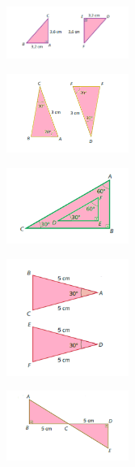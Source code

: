 {{{\begin{escolha}
\item
\begin{figure}[H]
\centering\includegraphics[width=4cm]{./imgSAEB_8_MAT/media/image19.png}
\end{figure}  
\item
\begin{figure}[H]
\centering\includegraphics[width=4cm]{./imgSAEB_8_MAT/media/image20.png}
\end{figure}  
\item
\begin{figure}[H]
\centering\includegraphics[width=4cm]{./imgSAEB_8_MAT/media/image21.png}
\end{figure}  
\item
\begin{figure}[H]
\centering\includegraphics[width=4cm]{./imgSAEB_8_MAT/media/image22.png}
\end{figure}  
\item
\begin{figure}[H]
\centering\includegraphics[width=4cm]{./imgSAEB_8_MAT/media/image23.png}
\end{figure}  
\end{escolha}


}}}
